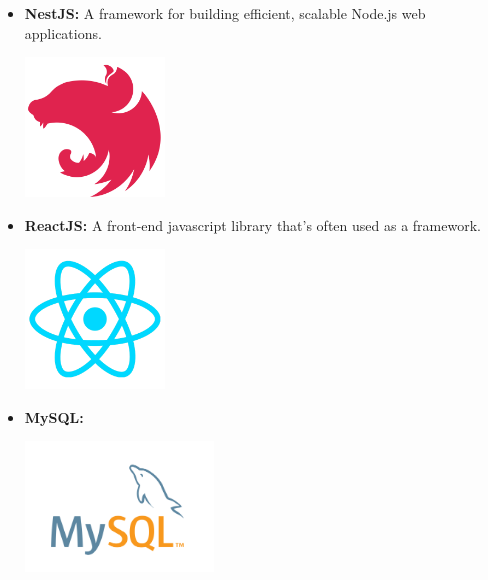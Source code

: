 \begin{itemize}
          \newpage
    \item \textbf{NestJS:} \newline A framework for building efficient, scalable Node.js web applications. \newline
          \begin{minipage}{\linewidth}
              \centering
              \includegraphics[width=3.7cm]{src/assets/logos/nestjs_512x512.png}
          \end{minipage}
    \item \textbf{ReactJS:} \newline A front-end javascript library that's often used as a framework. \newline
          \begin{minipage}{\linewidth}
              \centering
              \includegraphics[width=3.7cm]{src/assets/logos/react_512x512.png}
          \end{minipage}
    \item \textbf{MySQL:} \newline
          \begin{minipage}{\linewidth}
              \centering
              \includegraphics[width=5cm]{src/assets/logos/mysql.png}
          \end{minipage}


\end{itemize}
